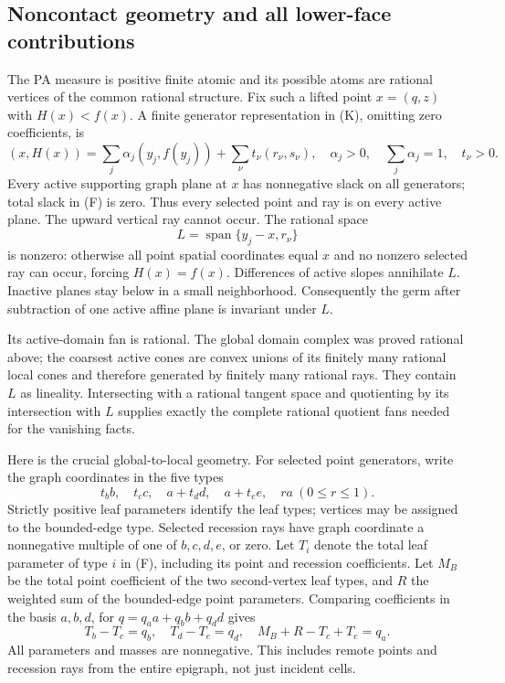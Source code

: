 \documentclass[
  11pt,
]{article}
\begin{document}
\subsection{Noncontact geometry and all lower-face
contributions}\label{noncontact-geometry-and-all-lower-face-contributions}

The PA measure is positive finite atomic and its possible atoms are
rational vertices of the common rational structure. Fix such a lifted
point \(x=(q,z)\) with \(H(x)<f(x)\). A finite generator representation
in (K), omitting zero coefficients, is \[
(x,H(x))=\sum_j\alpha_j(y_j,f(y_j))+\sum_\nu t_\nu(r_\nu,s_\nu),
\quad \alpha_j>0,\quad\sum_j\alpha_j=1,\quad t_\nu>0.
\tag{F}
\] Every active supporting graph plane at \(x\) has nonnegative slack on
all generators; total slack in (F) is zero. Thus every selected point
and ray is on every active plane. The upward vertical ray cannot occur.
The rational space \[
L=\operatorname{span}\{y_j-x,r_\nu\}
\tag{Q}
\] is nonzero: otherwise all point spatial coordinates equal \(x\) and
no nonzero selected ray can occur, forcing \(H(x)=f(x)\). Differences of
active slopes annihilate \(L\). Inactive planes stay below in a small
neighborhood. Consequently the germ after subtraction of one active
affine plane is invariant under \(L\).

Its active-domain fan is rational. The global domain complex was proved
rational above; the coarsest active cones are convex unions of its
finitely many rational local cones and therefore generated by finitely
many rational rays. They contain \(L\) as lineality. Intersecting with a
rational tangent space and quotienting by its intersection with \(L\)
supplies exactly the complete rational quotient fans needed for the
vanishing facts.

Here is the crucial global-to-local geometry. For selected point
generators, write the graph coordinates in the five types \[
t_b b,\quad t_c c,\quad a+t_d d,\quad a+t_e e,
\quad ra\ (0\leq r\leq1).
\] Strictly positive leaf parameters identify the leaf types; vertices
may be assigned to the bounded-edge type. Selected recession rays have
graph coordinate a nonnegative multiple of one of \(b,c,d,e\), or zero.
Let \(T_i\) denote the total leaf parameter of type \(i\) in (F),
including its point and recession coefficients. Let \(M_B\) be the total
point coefficient of the two second-vertex leaf types, and \(R\) the
weighted sum of the bounded-edge point parameters. Comparing
coefficients in the basis \(a,b,d\), for \(q=q_a a+q_b b+q_d d\) gives
\[
T_b-T_c=q_b,\quad T_d-T_e=q_d,
\quad M_B+R-T_c+T_e=q_a.
\tag{M}
\] All parameters and masses are nonnegative. This includes remote
points and recession rays from the entire epigraph, not just incident
cells.
\end{document}
